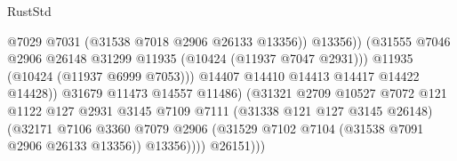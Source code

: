 \begin{lexlean}{RustStd}
\begin{coremodule}
                                                        @7029
                                                        @7031
                                                        (@31538 @7018 @2906 @26133 @13356))
                                                      @13356))
                                                  (@31555
                                                    @7046
                                                    @2906
                                                    @26148
                                                    @31299
                                                    @11935
                                                    (@10424 (@11937 @7047 @2931)))
                                                  @11935
                                                  (@10424 (@11937 @6999 @7053)))
                                                @14407
                                                @14410
                                                @14413
                                                @14417
                                                @14422
                                                @14428))
                                            @31679
                                            @11473
                                            @14557
                                            @11486)
                                          (@31321
                                            @2709
                                            @10527
                                            @7072
                                            @121
                                            @1122
                                            @127
                                            @2931
                                            @3145
                                            @7109
                                            @7111
                                            (@31338 @121 @127 @3145 @26148)
                                            (@32171
                                              @7106
                                              @3360
                                              @7079
                                              @2906
                                              (@31529
                                                @7102
                                                @7104
                                                (@31538 @7091 @2906 @26133 @13356))
                                              @13356))))
                                      @26151)))

\end{coremodule}
\end{lexlean}
